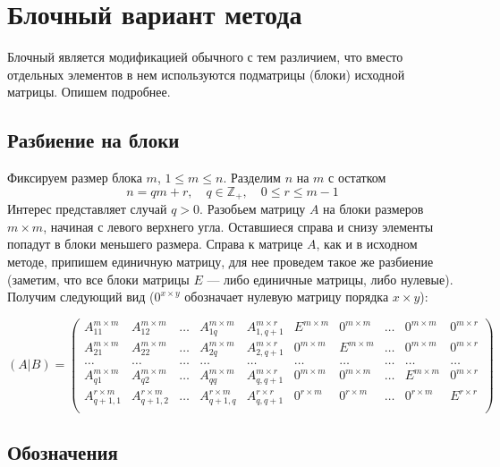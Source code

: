 \documentclass[12pt, russian]{article}
\begin{document}
\section{Блочный вариант метода}

Блочный является модификацией обычного с тем различием, что вместо отдельных элементов в нем используются подматрицы (блоки) исходной матрицы. Опишем подробнее.

\subsection{Разбиение на блоки}

Фиксируем размер блока $m$, $1\leq m \leq n$. Разделим $n$ на $m$ с остатком
$$ n = qm + r,\quad q\in \mathbb{Z}_+,\quad 0\leq r\leq m-1 $$
Интерес представляет случай $q > 0$. Разобьем матрицу $A$ на блоки размеров $m\times m$, начиная с левого верхнего угла. Оставшиеся справа и снизу элементы попадут в блоки меньшего размера. Справа к матрице $A$, как и в исходном методе, припишем единичную матрицу, для нее проведем такое же разбиение (заметим, что все блоки матрицы $E$ --- либо единичные матрицы, либо нулевые). Получим следующий вид ($0^{x\times y}$ обозначает нулевую матрицу порядка $x \times y$):

\[ 
(A|B) = \left( 
\begin{array} {rrrrr|rrrrr}
A_{11}^{m\times m} & A_{12}^{m\times m} & \ldots & A_{1q}^{m\times m} & A_{1,q+1}^{m\times r} 
& E^{m\times m} & 0^{m\times m} & \ldots & 0^{m\times m} & 0^{m\times r} \\
A_{21}^{m\times m} & A_{22}^{m\times m} & \ldots & A_{2q}^{m\times m} & A_{2,q+1}^{m\times r} 
& 0^{m\times m} & E^{m\times m} & \ldots & 0^{m\times m} & 0^{m\times r} \\
\ldots & \ldots & \ldots & \ldots & \ldots & \ldots & \ldots & \ldots & \ldots & \ldots \\
A_{q1}^{m\times m} & A_{q2}^{m\times m} & \ldots & A_{qq}^{m\times m} & A_{q,q+1}^{m\times r}  
& 0^{m\times m} & 0^{m\times m} & \ldots & E^{m\times m} & 0^{m\times r} \\
A_{q+1,1}^{r\times m} & A_{q+1,2}^{r\times m} & \ldots & A_{q+1,q}^{r\times m} & A_{q,q+1}^{r\times r}  
& 0^{r\times m} & 0^{r\times m} & \ldots & 0^{r\times m} & E^{r\times r} \\
\end{array} 
\right) 
\]

\subsection{Обозначения}
\end{document}
